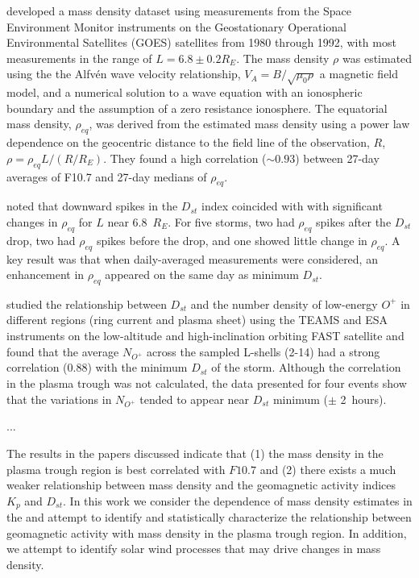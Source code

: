\documentclass[10pt,twocolumn]{article}
\begin{document}
\cite{Takahashi2010} developed a mass density dataset using measurements from the Space Environment Monitor instruments on the Geostationary Operational Environmental Satellites (GOES) satellites from 1980 through 1992, with most measurements in the range of $L=6.8\pm0.2 R_E$. The mass density $\rho$ was estimated using the the Alfv\'en wave velocity relationship, $V_A=B/\sqrt{\mu_0\rho}$ a magnetic field model, and a numerical solution to a wave equation with an ionospheric boundary and the assumption of a zero resistance ionosphere.  The equatorial mass density, $\rho_{eq}$, was derived from the estimated mass density using a power law dependence on the geocentric distance to the field line of the observation, $R$, $\rho=\rho_{eq}L/(R/R_E)$.  They found a high correlation ($\sim 0.93$) between 27-day averages of F10.7 and 27-day medians of $\rho_{eq}$.

\cite{Takahashi2010} noted that downward spikes in the $D_{st}$ index coincided with with significant changes in $\rho_{eq}$ for $L$ near 6.8~$R_E$. For five storms, two had $\rho_{eq}$ spikes after the $D_{st}$ drop, two had $\rho_{eq}$ spikes before the drop, and one showed little change in $\rho_{eq}$.  A key result was that when daily-averaged measurements were considered, an enhancement in $\rho_{eq}$ appeared on the same day as minimum $D_{st}$.

\cite{Yao2008} studied the relationship between $D_{st}$ and the number density of low-energy $O^+$ in different regions (ring current and plasma sheet) using the TEAMS and ESA instruments on the low-altitude and high-inclination orbiting FAST satellite and found that the average $N_{O^+}$ across the sampled L-shells (2-14) had a strong correlation (0.88) with the minimum $D_{st}$ of the storm.  Although the correlation in the plasma trough was not calculated, the data presented for four events show that the variations in $N_{O^+}$ tended to appear near $D_{st}$ minimum ($\pm$ 2~hours).

\cite{Denton2016} ...

The results in the papers discussed indicate that (1) the mass density in the plasma trough region is best correlated with $F10.7$ and (2) there exists a much weaker relationship between mass density and the geomagnetic activity indices $K_p$ and $D_{st}$.  In this work we consider the dependence of mass density estimates in the \cite{Takahashi2010} and attempt to identify and statistically characterize the relationship between geomagnetic activity with mass density in the plasma trough region.  In addition, we attempt to identify solar wind processes that may drive changes in mass density. 
\end{document}
